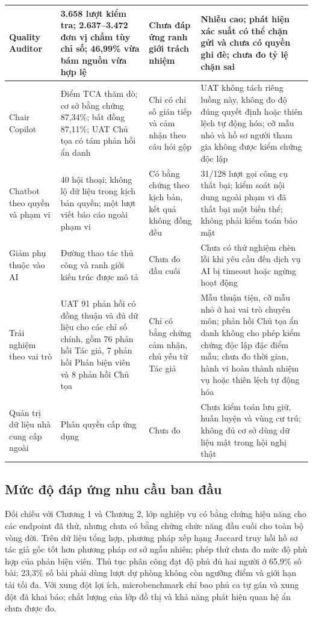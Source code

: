\begin{PrismLongTable}
\begin{longtable}{|P{0.18\textwidth}|P{0.25\textwidth}|P{0.19\textwidth}|P{0.30\textwidth}|}
  Quality Auditor & 3.658 lượt kiểm tra; 2.637--3.472 đơn vị chấm tùy chỉ số; 46,99\% vừa bám nguồn vừa hợp lệ & Chưa đáp ứng ranh giới trách nhiệm & Nhiễu cao; phát hiện xác suất có thể chặn gửi và chưa có quyền ghi đè; chưa đo tỷ lệ chặn sai \\ \hline
  Chair Copilot & Điểm TCA thăm dò; cơ sở bằng chứng 87,34\%; bất đồng 87,11\%; UAT Chủ tọa có tám phản hồi ẩn danh & Chỉ có chỉ số gián tiếp và cảm nhận theo câu hỏi gộp & UAT không tách riêng luồng này, không đo độ đúng quyết định hoặc thiên lệch tự động hóa; cỡ mẫu nhỏ và hồ sơ người tham gia không được kiểm chứng độc lập \\ \hline
  Chatbot theo quyền và phạm vi & 40 hội thoại; không lộ dữ liệu trong kịch bản quyền; một lượt viết báo cáo ngoài phạm vi & Có bằng chứng theo kịch bản, kết quả không đồng đều & 31/128 lượt gọi công cụ thất bại; kiểm soát nội dung ngoài phạm vi đã thất bại một biến thể; không phải kiểm toán bảo mật \\ \hline
  Giảm phụ thuộc vào AI & Đường thao tác thủ công và ranh giới kiến trúc được mô tả & Chưa đo đầu cuối & Chưa có thử nghiệm chèn lỗi khi yêu cầu đến dịch vụ AI bị timeout hoặc ngừng hoạt động \\ \hline
  Trải nghiệm theo vai trò & UAT 91 phản hồi có đồng thuận và đủ dữ liệu cho các chỉ số chính, gồm 76 phản hồi Tác giả, 7 phản hồi Phản biện viên và 8 phản hồi Chủ tọa & Chỉ có bằng chứng cảm nhận, chủ yếu từ Tác giả & Mẫu thuận tiện, cỡ mẫu nhỏ ở hai vai trò chuyên môn; phản hồi Chủ tọa ẩn danh không cho phép kiểm chứng độc lập đặc điểm mẫu; chưa đo thời gian, hành vi hoàn thành nhiệm vụ hoặc thiên lệch tự động hóa \\ \hline
  Quản trị dữ liệu nhà cung cấp ngoài & Phân quyền cấp ứng dụng & Chưa đo & Chưa kiểm toán lưu giữ, huấn luyện và vùng cư trú; không đủ cơ sở dùng dữ liệu mật trong hội nghị thật \\ \hline
\end{longtable}
\end{PrismLongTable}

\subsection{Mức độ đáp ứng nhu cầu ban đầu}

Đối chiếu với Chương 1 và Chương 2, lớp nghiệp vụ có bằng chứng hiệu năng cho các endpoint đã thử, nhưng chưa có bằng chứng chức năng đầu cuối cho toàn bộ vòng đời. Trên dữ liệu tổng hợp, phương pháp xếp hạng Jaccard truy hồi hồ sơ tác giả gốc tốt hơn phương pháp cơ sở ngẫu nhiên; phép thử chưa đo mức độ phù hợp của phản biện viên. Thủ tục phân công đạt độ phủ đủ hai người ở 65,9\% số bài; 23,3\% số bài phải dùng lượt dự phòng không còn ngưỡng điểm và giới hạn tải tối đa. Với xung đột lợi ích, microbenchmark chỉ bao phủ ca tự gán và xung đột đã khai báo; chất lượng của lớp đồ thị và khả năng phát hiện quan hệ ẩn chưa được đo.

